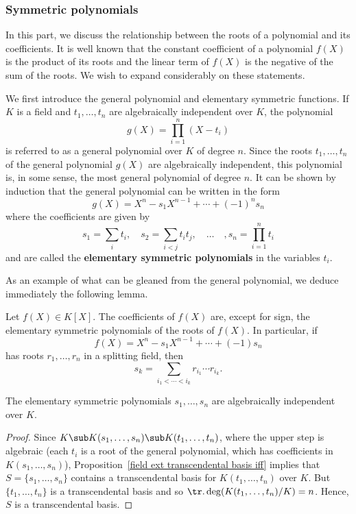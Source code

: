 \subsubsection{Symmetric polynomials}
In this part, we discuss the relationship between the roots of a polynomial and its coefficients. It is well known that the constant coefficient of a polynomial $f(X)$ is the product of its roots and the linear term of $f(X)$ is the negative of the sum of the roots. We wish to expand considerably on these statements.\par
We first introduce the general polynomial and elementary symmetric functions. If $K$ is a field and $t_1,\dots,t_n$ are algebraically independent over $K$, the polynomial
\[g(X)=\prod_{i=1}^{n}(X-t_i)\]
is referred to as a general polynomial over $K$ of degree $n$. Since the roots $t_1,\dots,t_n$ of the general polynomial $g(X)$ are algebraically independent, this polynomial is, in some sense, the most general polynomial of degree $n$. It can be shown by induction that the general polynomial can be written in the form
\[g(X)=X^n-s_1X^{n-1}+\cdots+(-1)^ns_n\]
where the coefficients are given by
\[s_1=\sum_it_i,\quad s_2=\sum_{i<j}t_it_j,\quad\dots\quad,s_n=\prod_{i=1}^{n}t_i\]
and are called the \textbf{elementary symmetric polynomials} in the variables $t_i$.\par
As an example of what can be gleaned from the general polynomial, we deduce immediately the following lemma.
\begin{lemma}\label{polynomial coefficient in roots}
Let $f(X)\in K[X]$. The coefficients of $f(X)$ are, except for sign, the elementary symmetric polynomials of the roots of $f(X)$. In particular, if
\[f(X)=X^n-s_1X^{n-1}+\cdots+(-1)s_n\]
has roots $r_1,\dots,r_n$ in a splitting field, then
\[s_k=\sum_{i_1<\cdots<i_k}r_{i_1}\cdots r_{i_k}.\]
\end{lemma}
\begin{proposition}
The elementary symmetric polynomials $s_1,\dots,s_n$ are algebraically independent over $K$.
\end{proposition}
\begin{proof}
Since $K\sub K(s_1,\dots,s_n)\sub K(t_1,\dots,t_n)$, where the upper step is algebraic (each $t_i$ is a root of the general polynomial, which has coefficients in $K(s_1,\dots,s_n)$), Proposition~\ref{field ext transcendental basis iff} implies that $S=\{s_1,\dots,s_n\}$ contains a transcendental basis for $K(t_1,\dots,t_n)$ over $K$. But $\{t_1,\dots,t_n\}$ is a transcendental basis and so $\tr.\deg(K(t_1,\dots,t_n)/K)=n$. Hence, $S$ is a transcendental basis.
\end{proof}
